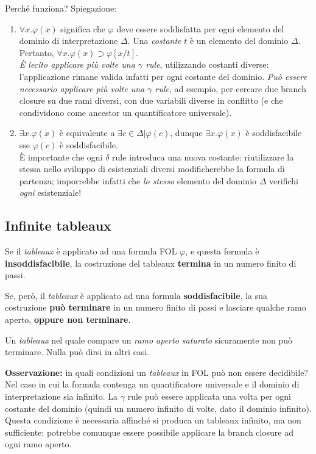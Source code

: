 Perché funziona? Spiegazione:
\begin{enumerate}
\item $\forall x . \varphi(x)$ significa che $\varphi$ deve essere soddisfatta per ogni elemento del dominio di interpretazione $\Delta$. Una \textit{costante} $t$ è un elemento del dominio $\Delta$. Pertanto, $\forall x. \varphi(x) \supset \varphi[x/t]$.\\\textit{È lecito applicare più volte una $\gamma$ rule}, utilizzando costanti diverse: l'applicazione rimane valida infatti per ogni costante del dominio. \textit{Può essere necessario applicare più volte una $\gamma$ rule}, ad esempio, per cercare due branch closure su due rami diversi, con due variabili diverse in conflitto (e che condividono come ancestor un quantificatore universale).
\item $\exists x. \varphi(x)$ è equivalente a $\exists c \in \Delta | \varphi(c)$, dunque $\exists x. \varphi(x)$ è soddisfacibile sse $\varphi(c)$ è soddisfacibile.\\È importante che ogni $\delta$ rule introduca una nuova costante: riutilizzare la stessa nello sviluppo di esistenziali diversi modificherebbe la formula di partenza; imporrebbe infatti che \textit{lo stesso} elemento del dominio $\Delta$ verifichi \textit{ogni} esistenziale!
\end{enumerate}

\vspace{1em}

\subsection{Infinite tableaux}
Se il \textit{tableaux} è applicato ad una formula FOL $\varphi$, e questa formula è \textbf{insoddisfacibile}, la costruzione del tableaux \textbf{termina} in un numero finito di passi.

Se, però, il \textit{tableaux} è applicato ad una formula \textbf{soddisfacibile}, la sua costruzione \textbf{può terminare} in un numero finito di passi e lasciare qualche ramo aperto, \textbf{oppure non terminare}.

Un \textit{tableaux} nel quale compare un \textit{ramo aperto saturato} sicuramente non può terminare. Nulla può dirsi in altri casi.

\textbf{Osservazione:} in quali condizioni un \textit{tableaux} in FOL può non essere decidibile? Nel caso in cui la formula contenga un quantificatore universale e il dominio di interpretazione sia infinito. La $\gamma$ rule può essere applicata una volta per ogni costante del dominio (quindi un numero infinito di volte, dato il dominio infinito). Questa condizione è necessaria affinché si produca un tableaux infinito, ma non sufficiente: potrebbe comunque essere possibile applicare la branch closure ad ogni ramo aperto.

